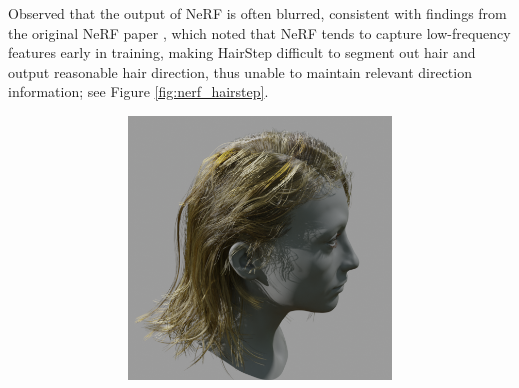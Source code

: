 \documentclass{article}
\begin{document}
Observed that the output of NeRF is often blurred, consistent with findings from the original NeRF paper \cite{mildenhall_nerf_2020}, which noted that NeRF tends to capture low-frequency features early in training, making HairStep difficult to segment out hair and output reasonable hair direction, thus unable to maintain relevant direction information; see Figure \ref{fig:nerf_hairstep}.

\begin{figure}[h]
    \centering
    \begin{subfigure}{0.22\textwidth}
        \centering
        \begin{subfigure}{0.48\textwidth}
            \centering
            \includegraphics[width=\textwidth]{./images/baseline-method/test_6_rendered.png}
        \end{subfigure}
        \hfill
        \begin{subfigure}{0.48\textwidth}
            \centering

\end{subfigure}
\end{subfigure}
\end{figure}
\end{document}
